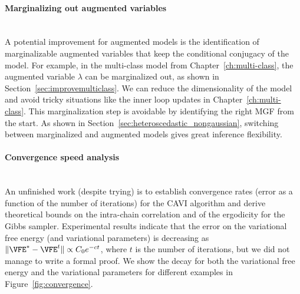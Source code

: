 \paragraph{Marginalizing out augmented variables}\mbox{}\\
A potential improvement for augmented models is the identification of marginalizable augmented variables that keep the conditional conjugacy of the model.
For example, in the multi-class model from Chapter~\ref{ch:multi-class}, the augmented variable $\lambda$ can be marginalized out, as shown in Section~\ref{sec:improvemulticlass}.
We can reduce the dimensionality of the model and avoid tricky situations like the inner loop updates in Chapter~\ref{ch:multi-class}.
This marginalization step is avoidable by identifying the right \ac{MGF} from the start.
As shown in Section~\ref{sec:heteroscedastic_nongaussian}, switching between marginalized and augmented models gives great inference flexibility.

\paragraph{Convergence speed analysis}\mbox{}\\
An unfinished work (despite trying) is to establish convergence rates (error as a function of the number of iterations) for the \ac{CAVI} algorithm and derive theoretical bounds on the intra-chain correlation and of the ergodicity for the Gibbs sampler.
Experimental results indicate that the error on the variational free energy (and variational parameters) is decreasing as $\|\VFE^{*} - \VFE^{t}\|\propto C_0 e^{-ct}$, where $t$ is the number of iterations, but we did not manage to write a formal proof.
We show the decay for both the variational free energy and the variational parameters for different examples in Figure~\ref{fig:convergence}.

